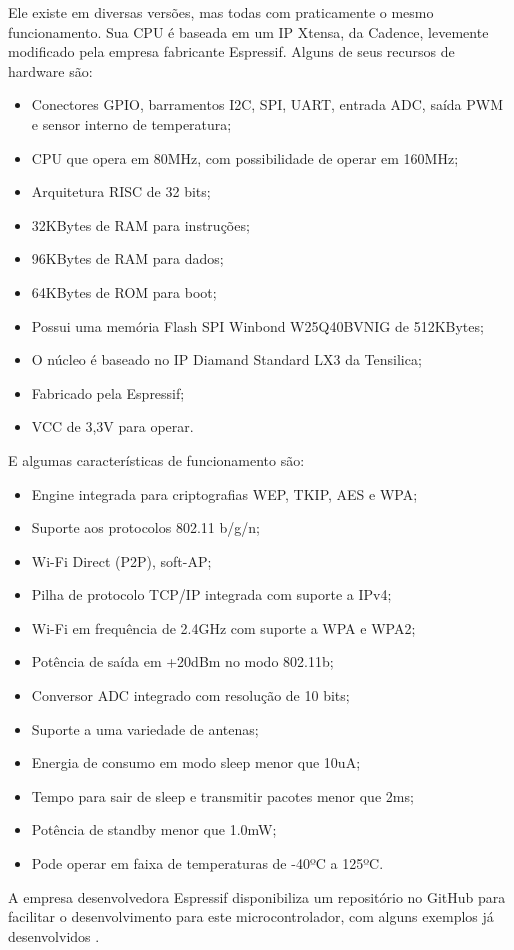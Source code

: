 Ele existe em diversas versões, mas todas com praticamente o mesmo funcionamento. Sua CPU é baseada em um IP Xtensa, da Cadence, levemente modificado pela empresa fabricante Espressif.
Alguns de seus recursos de hardware são:

\begin{itemize}
	\item Conectores GPIO, barramentos I2C, SPI, UART, entrada ADC, saída PWM e sensor interno de temperatura;
	\item CPU que opera em 80MHz, com possibilidade de operar em 160MHz;
	\item Arquitetura RISC de 32 bits;
	\item 32KBytes de RAM para instruções;
	\item 96KBytes de RAM para dados;
	\item 64KBytes de ROM para boot;
	\item Possui uma memória Flash SPI Winbond W25Q40BVNIG de 512KBytes;
	\item O núcleo é baseado no IP Diamand Standard LX3 da Tensilica;
	\item Fabricado pela Espressif;
	\item VCC de 3,3V para operar.
\end{itemize}

E algumas características de funcionamento são:
\begin{itemize}	
	\item Engine integrada para criptografias WEP, TKIP, AES e WPA;
	\item Suporte aos protocolos 802.11 b/g/n;
	\item Wi-Fi Direct (P2P), soft-AP;
	
	\item Pilha de protocolo TCP/IP integrada com suporte a IPv4;
	\item Wi-Fi em frequência de 2.4GHz com suporte a WPA e WPA2;
	\item Potência de saída em +20dBm no modo 802.11b;
	
	\item Conversor ADC integrado com resolução de 10 bits;
	\item Suporte a uma variedade de antenas;
	\item Energia de consumo em modo sleep menor que 10uA;
	
	\item Tempo para sair de sleep e transmitir pacotes menor que 2ms;
	\item Potência de standby menor que 1.0mW;
	\item Pode operar em faixa de temperaturas de -40ºC a 125ºC.
	
\end{itemize}

A empresa desenvolvedora Espressif \cite{espressif_ref} disponibiliza um repositório no GitHub para facilitar o desenvolvimento para este microcontrolador, com alguns exemplos já desenvolvidos \cite{esp8266_site}.